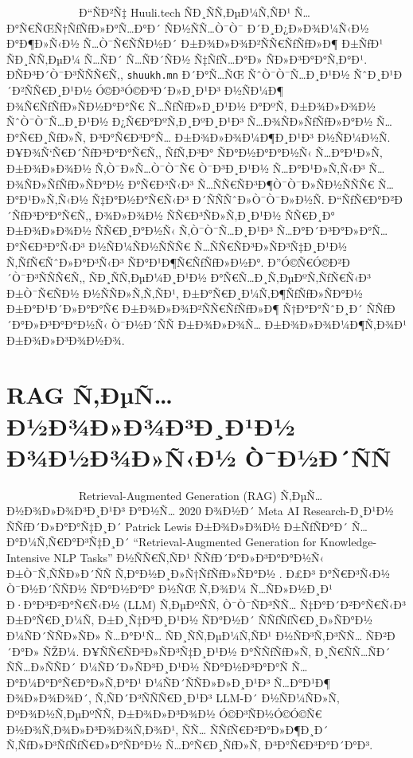 \documentclass[12pt,A4]{report}
\begin{document}
\ \ \ \ \ \ \ \ \  \ \ \ \ Ð“ÑÐ²Ñ‡ Huuli.tech ÑÐ¸ÑÑ‚ÐµÐ¼Ñ‚ÑÐ¹ Ñ…Ð°Ñ€ÑŒÑ†ÑƒÑƒÐ»Ð°Ñ…Ð°Ð´
ÑÐ½ÑÑ…Ò¯Ò¯ Ð´Ð¸Ð¿Ð»Ð¾Ð¼Ñ‹Ð½ Ð°Ð¶Ð»Ñ‹Ð½ Ñ…Ò¯Ñ€ÑÑÐ½Ð´ Ð±Ð¾Ð»Ð¾Ð²ÑÑ€ÑƒÑƒÐ»Ð¶ Ð±ÑƒÐ¹ ÑÐ¸ÑÑ‚ÐµÐ¼ Ñ…ÑÐ´ Ñ…ÑÐ´ÑÐ½
Ñ‡ÑƒÑ…Ð°Ð» ÑÐ»Ð³Ð°Ð°Ñ‚Ð°Ð¹. ÐÑÐ³Ð´Ò¯Ð³ÑÑÑ€Ñ‚, \texttt{shuukh.mn} Ð´Ð°Ñ…ÑŒ ÑˆÒ¯Ò¯Ñ…Ð¸Ð¹Ð½ ÑˆÐ¸Ð¹Ð´Ð²ÑÑ€Ð¸Ð¹Ð½
Ó©Ð³Ó©Ð³Ð´Ð»Ð¸Ð¹Ð³ Ð½ÑÐ¼Ð¶ Ð¾Ñ€ÑƒÑƒÐ»ÑÐ½Ð°Ð°Ñ€ Ñ…ÑƒÑƒÐ»Ð¸Ð¹Ð½ Ð°ÐºÑ‚ Ð±Ð¾Ð»Ð¾Ð½ ÑˆÒ¯Ò¯Ñ…Ð¸Ð¹Ð½ Ð¿Ñ€Ð°ÐºÑ‚Ð¸ÐºÐ¸Ð¹Ð³ Ñ…Ð¾ÑÐ»ÑƒÑƒÐ»Ð°Ð½
Ñ…Ð°Ñ€Ð¸ÑƒÐ»Ñ‚ Ð³Ð°Ñ€Ð³Ð°Ñ… Ð±Ð¾Ð»Ð¾Ð¼Ð¶Ð¸Ð¹Ð³ Ð½ÑÐ¼Ð½Ñ. Ð¥Ð¾Ñ‘Ñ€Ð´ÑƒÐ³Ð°Ð°Ñ€Ñ‚, ÑƒÑ‚Ð³Ð° ÑÐ°Ð½Ð°Ð°Ð½Ñ‹ Ñ…Ð°Ð¹Ð»Ñ‚ Ð±Ð¾Ð»Ð¾Ð½
Ñ‚Ò¯Ð»Ñ…Ò¯Ò¯Ñ€ Ò¯Ð³Ð¸Ð¹Ð½ Ñ…Ð°Ð¹Ð»Ñ‚Ñ‹Ð³ Ñ…Ð¾ÑÐ»ÑƒÑƒÐ»ÑÐ°Ð½ Ð°Ñ€Ð³Ñ‹Ð³ Ñ…ÑÑ€ÑÐ³Ð¶Ò¯Ò¯Ð»ÑÐ½ÑÑÑ€ Ñ…Ð°Ð¹Ð»Ñ‚Ñ‹Ð½ Ñ‡Ð°Ð½Ð°Ñ€Ñ‹Ð³
Ð´ÑÑÑˆÐ»Ò¯Ò¯Ð»Ð½Ñ. Ð“ÑƒÑ€Ð°Ð²Ð´ÑƒÐ³Ð°Ð°Ñ€Ñ‚, Ð¾Ð»Ð¾Ð½ ÑÑ€Ð³ÑÐ»Ñ‚Ð¸Ð¹Ð½ ÑÑ€Ð¸Ð° Ð±Ð¾Ð»Ð¾Ð½ ÑÑ€Ð¸Ð°Ð½Ñ‹ Ñ‚Ò¯Ò¯Ñ…Ð¸Ð¹Ð³
Ñ…Ð°Ð´Ð³Ð°Ð»Ð°Ñ… Ð°Ñ€Ð³Ð°Ñ‹Ð³ Ð½ÑÐ¼ÑÐ½ÑÑÑ€ Ñ…ÑÑ€ÑÐ³Ð»ÑÐ³Ñ‡Ð¸Ð¹Ð½ Ñ‚ÑƒÑ€ÑˆÐ»Ð°Ð³Ñ‹Ð³ ÑÐ°Ð¹Ð¶Ñ€ÑƒÑƒÐ»Ð½Ð°.
Ð”Ó©Ñ€Ó©Ð²Ð´Ò¯Ð³ÑÑÑ€Ñ‚, ÑÐ¸ÑÑ‚ÐµÐ¼Ð¸Ð¹Ð½ Ð°Ñ€Ñ…Ð¸Ñ‚ÐµÐºÑ‚ÑƒÑ€Ñ‹Ð³ Ð±Ò¯Ñ€ÑÐ½ Ð½ÑÑÐ»Ñ‚Ñ‚ÑÐ¹, Ð±Ð°Ñ€Ð¸Ð¼Ñ‚Ð¶ÑƒÑƒÐ»ÑÐ°Ð½
Ð±Ð°Ð¹Ð´Ð»Ð°Ð°Ñ€ Ð±Ð¾Ð»Ð¾Ð²ÑÑ€ÑƒÑƒÐ»Ð¶ Ñ†Ð°Ð°ÑˆÐ¸Ð´ ÑÑƒÐ´Ð°Ð»Ð³Ð°Ð°Ð½Ñ‹ Ò¯Ð½Ð´ÑÑ Ð±Ð¾Ð»Ð¾Ñ… Ð±Ð¾Ð»Ð¾Ð¼Ð¶Ñ‚Ð¾Ð¹ Ð±Ð¾Ð»Ð³Ð¾Ð½Ð¾.

\section{RAG Ñ‚ÐµÑ…Ð½Ð¾Ð»Ð¾Ð³Ð¸Ð¹Ð½ Ð¾Ð½Ð¾Ð»Ñ‹Ð½ Ò¯Ð½Ð´ÑÑ}

\ \ \ \ \ \ \ \ \  \ \ \ \ Retrieval-Augmented Generation (RAG) Ñ‚ÐµÑ…Ð½Ð¾Ð»Ð¾Ð³Ð¸Ð¹Ð³
Ð°Ð½Ñ… 2020 Ð¾Ð½Ð´ Meta AI Research-Ð¸Ð¹Ð½ ÑÑƒÐ´Ð»Ð°Ð°Ñ‡Ð¸Ð´ Patrick Lewis Ð±Ð¾Ð»Ð¾Ð½
Ð±ÑƒÑÐ°Ð´ Ñ…Ð°Ð¼Ñ‚Ñ€Ð°Ð³Ñ‡Ð¸Ð´ ``Retrieval-Augmented Generation for Knowledge-Intensive
NLP Tasks'' Ð½ÑÑ€Ñ‚ÑÐ¹ ÑÑƒÐ´Ð°Ð»Ð³Ð°Ð°Ð½Ñ‹ Ð±Ò¯Ñ‚ÑÑÐ»Ð´ÑÑ Ñ‚Ð°Ð½Ð¸Ð»Ñ†ÑƒÑƒÐ»ÑÐ°Ð½
\cite{lewis2020retrieval}. Ð£Ð³ Ð°Ñ€Ð³Ñ‹Ð½ Ò¯Ð½Ð´ÑÑÐ½ ÑÐ°Ð½Ð°Ð° Ð½ÑŒ Ñ‚Ð¾Ð¼ Ñ…ÑÐ»Ð½Ð¸Ð¹ Ð·Ð°Ð³Ð²Ð°Ñ€Ñ‹Ð½
(LLM) Ñ‚ÐµÐºÑÑ‚ Ò¯Ò¯ÑÐ³ÑÑ… Ñ‡Ð°Ð´Ð²Ð°Ñ€Ñ‹Ð³ Ð±Ð°Ñ€Ð¸Ð¼Ñ‚ Ð±Ð¸Ñ‡Ð³Ð¸Ð¹Ð½ ÑÐ°Ð½Ð´ ÑÑƒÑƒÑ€Ð¸Ð»ÑÐ°Ð½ Ð¼ÑÐ´ÑÑÐ»ÑÐ» Ñ…Ð°Ð¹Ñ…
ÑÐ¸ÑÑ‚ÐµÐ¼Ñ‚ÑÐ¹ Ð½ÑÐ³Ñ‚Ð³ÑÑ… ÑÐ²Ð´Ð°Ð» ÑŽÐ¼. Ð¥ÑÑ€ÑÐ³Ð»ÑÐ³Ñ‡Ð¸Ð¹Ð½ Ð°ÑÑƒÑƒÐ»Ñ‚ Ð¸Ñ€ÑÑ…ÑÐ´ ÑÑ…Ð»ÑÑÐ´ Ð¼ÑÐ´Ð»ÑÐ³Ð¸Ð¹Ð½
ÑÐ°Ð½Ð³Ð°Ð°Ñ Ñ…Ð°Ð¼Ð°Ð°Ñ€Ð°Ð»Ñ‚Ð°Ð¹ Ð¼ÑÐ´ÑÑÐ»Ð»Ð¸Ð¹Ð³ Ñ…Ð°Ð¹Ð¶ Ð¾Ð»Ð¾Ð¾Ð´, Ñ‚ÑÐ´Ð³ÑÑÑ€Ð¸Ð¹Ð³ LLM-Ð´ Ð½ÑÐ¼ÑÐ»Ñ‚
ÐºÐ¾Ð½Ñ‚ÐµÐºÑÑ‚ Ð±Ð¾Ð»Ð³Ð¾Ð½ Ó©Ð³ÑÐ½Ó©Ó©Ñ€ Ð½Ð¾Ñ‚Ð¾Ð»Ð³Ð¾Ð¾Ñ‚Ð¾Ð¹, ÑÑ… ÑÑƒÑ€Ð²Ð°Ð»Ð¶Ð¸Ð´ Ñ‚ÑƒÐ»Ð³ÑƒÑƒÑ€Ð»Ð°ÑÐ°Ð½ Ñ…Ð°Ñ€Ð¸ÑƒÐ»Ñ‚
Ð³Ð°Ñ€Ð³Ð°Ð´Ð°Ð³.
\end{document}
